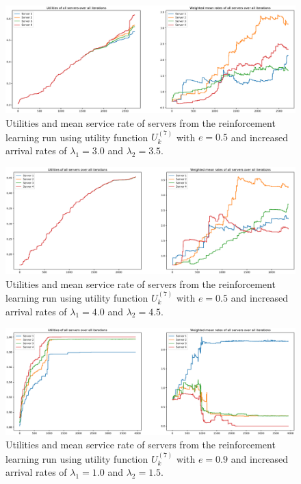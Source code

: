 \begin{figure}[H]
    \includegraphics[width=\textwidth]{chapters/00_appendix/03_more_rl_results/Bin/utility_7_eps/u7_4_e05_Lambda_65.eps}
    \caption{Utilities and mean service rate of servers from the reinforcement
    learning run using utility function \(U_k^{(7)}\) with \(e = 0.5\) and
    increased arrival rates of \(\lambda_1 = 3.0\) and \(\lambda_2 = 3.5\).}
    \label{fig:RL_utility7_4_e05_Lambda_65}
\end{figure}

\begin{figure}[H]
    \includegraphics[width=\textwidth]{chapters/00_appendix/03_more_rl_results/Bin/utility_7_eps/u7_4_e05_Lambda_85.eps}
    \caption{Utilities and mean service rate of servers from the reinforcement
    learning run using utility function \(U_k^{(7)}\) with \(e = 0.5\) and
    increased arrival rates of \(\lambda_1 = 4.0\) and \(\lambda_2 = 4.5\).}
    \label{fig:RL_utility7_4_e05_Lambda_85}
\end{figure}

\begin{figure}[H]
    \includegraphics[width=\textwidth]{chapters/00_appendix/03_more_rl_results/Bin/utility_7_eps/u7_4_e09_Lambda_25.eps}
    \caption{Utilities and mean service rate of servers from the reinforcement
    learning run using utility function \(U_k^{(7)}\) with \(e = 0.9\) and
    increased arrival rates of \(\lambda_1 = 1.0\) and \(\lambda_2 = 1.5\).}
    \label{fig:RL_utility7_4_e09_Lambda_25}
\end{figure}

